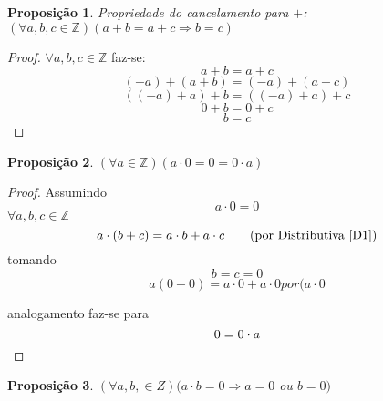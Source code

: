 \documentclass[a4paper,12pt]{article}
\newtheorem{prop_int}{Proposição}
\begin{document}
\begin{prop_int} %
  Propriedade do cancelamento para $+$:\\
  $(\forall a, b, c \in \mathbb{Z})(a + b = a + c \Longrightarrow b = c)$\\
\end{prop_int}
\begin{proof}
    $\forall a, b, c \in \mathbb{Z}$ faz-se:%
  \begin{equation*}
    a + b = a + c %
  \end{equation*}
  \begin{equation*}
    (-a) + (a + b) = (-a) + (a + c) %
  \end{equation*}
  \begin{equation*}
    ((-a) + a) + b = ((-a) + a) + c %
  \end{equation*}
  \begin{equation*}
    0 + b = 0 + c
  \end{equation*}
  \begin{equation*}
    b = c
  \end{equation*}
\end{proof}

\begin{prop_int} %
  $(\forall a \in \mathbb{Z})(a \cdot 0 = 0 = 0 \cdot a)$
\end{prop_int}
\begin{proof}
  Assumindo
  \begin{equation*}
    a \cdot 0 = 0
  \end{equation*}
  $\forall a, b, c \in \mathbb{Z}$
  \begin{equation*}
   a \cdot (b + c) = a \cdot b + a \cdot c \tag{por Distributiva~\ref{D1}}   
  \end{equation*}
  tomando
  \begin{equation*}
    b = c = 0 
  \end{equation*}
  \begin{equation*}
    a (0 + 0) = a \cdot 0 + a \cdot 0 por (  a \cdot 0
  \end{equation*}

  analogamento faz-se para
  \begin{equation*}
    \\
    0 = 0 \cdot a
  \end{equation*}
\end{proof}

\begin{prop_int} %
  $(\forall a, b, \in Z)(a \cdot b = 0 \Longrightarrow a = 0$ ou $b = 0)$
\end{prop_int}
\end{document}
